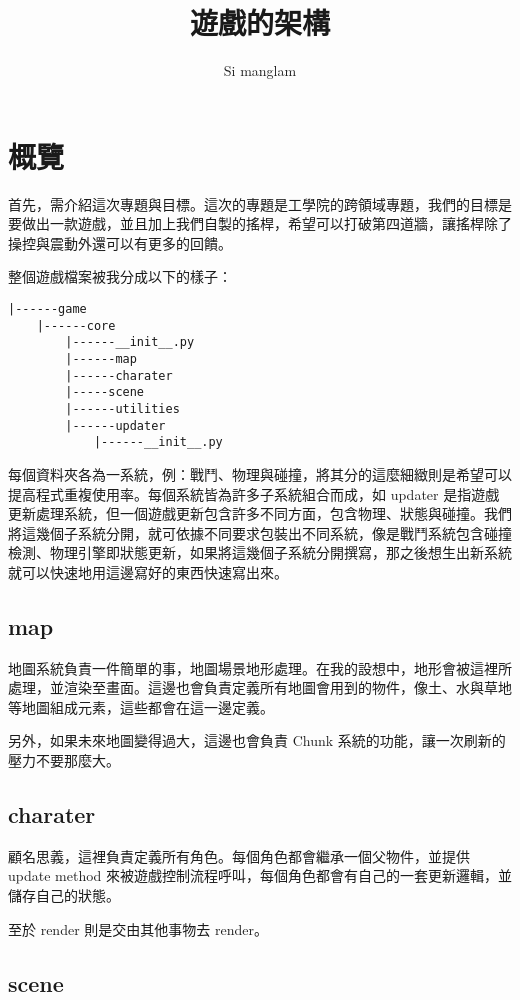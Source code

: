 \documentclass[12pt, a4paper]{NGPLB}
\title{遊戲的架構}
\author{Si manglam}
\begin{document}

\chapter{概覽}

首先，需介紹這次專題與目標。這次的專題是工學院的跨領域專題，我們的目標是要做出一款遊戲，並且加上我們自製的搖桿，希望可以打破第四道牆，讓搖桿除了操控與震動外還可以有更多的回饋。

整個遊戲檔案被我分成以下的樣子：

\begin{tcolorbox}
\begin{verbatim}
|------game
    |------core
        |------__init__.py
        |------map
        |------charater
        |-----scene
        |------utilities
        |------updater
            |------__init__.py
\end{verbatim}
\end{tcolorbox}

每個資料夾各為一系統，例：戰鬥、物理與碰撞，將其分的這麼細緻則是希望可以提高程式重複使用率。每個系統皆為許多子系統組合而成，如 updater 是指遊戲更新處理系統，但一個遊戲更新包含許多不同方面，包含物理、狀態與碰撞。我們將這幾個子系統分開，就可依據不同要求包裝出不同系統，像是戰鬥系統包含碰撞檢測、物理引擎即狀態更新，如果將這幾個子系統分開撰寫，那之後想生出新系統就可以快速地用這邊寫好的東西快速寫出來。

\section{map}

地圖系統負責一件簡單的事，地圖場景地形處理。在我的設想中，地形會被這裡所處理，並渲染至畫面。這邊也會負責定義所有地圖會用到的物件，像土、水與草地等地圖組成元素，這些都會在這一邊定義。

另外，如果未來地圖變得過大，這邊也會負責 Chunk 系統的功能，讓一次刷新的壓力不要那麼大。

\section{charater}

顧名思義，這裡負責定義所有角色。每個角色都會繼承一個父物件，並提供  update method 來被遊戲控制流程呼叫，每個角色都會有自己的一套更新邏輯，並儲存自己的狀態。

至於 render 則是交由其他事物去 render。

\section{scene}
\end{document}

